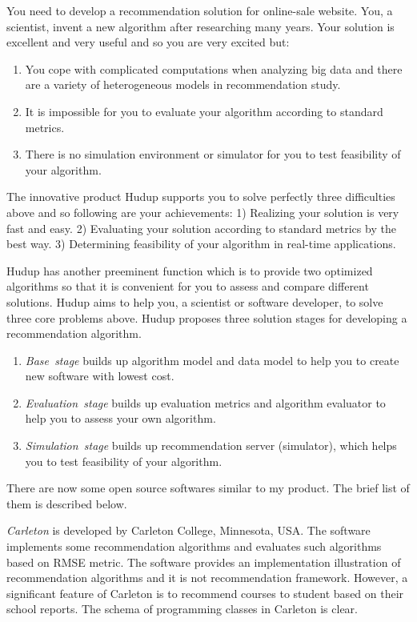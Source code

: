 \documentclass[a4paper]{llncs}
\begin{document}
You need to develop a recommendation solution for online-sale website. You, a scientist, invent a new algorithm after researching many years. Your solution is excellent and very useful and so you are very excited but:
\begin{enumerate}
\item You cope with complicated computations when analyzing big data and there are a variety of heterogeneous models in recommendation study.
\item It is impossible for you to evaluate your algorithm according to standard metrics.
\item There is no simulation environment or simulator for you to test feasibility of your algorithm.
\end{enumerate}
The innovative product Hudup supports you to solve perfectly three difficulties above and so following are your achievements: 1) Realizing your solution is very fast and easy. 2) Evaluating your solution according to standard metrics by the best way. 3) Determining feasibility of your algorithm in real-time applications.

Hudup has another preeminent function which is to provide two optimized algorithms so that it is convenient for you to assess and compare different solutions. Hudup aims to help you, a scientist or software developer, to solve three core problems above. Hudup proposes three solution stages for developing a recommendation algorithm.
\begin{enumerate}
\item \textit{Base~stage} builds up algorithm model and data model to help you to create new software with lowest cost.
\item \textit{Evaluation~stage} builds up evaluation metrics and algorithm evaluator to help you to assess your own algorithm.
\item \textit{Simulation~stage} builds up recommendation server (simulator), which helps you to test feasibility of your algorithm.
\end{enumerate}
There are now some open source softwares similar to my product. The brief list of them is described below.

\textit{Carleton} \cite{carleton} is developed by Carleton College, Minnesota, USA. The software implements some recommendation algorithms and evaluates such algorithms based on RMSE metric. The software provides an implementation illustration of recommendation algorithms and it is not recommendation framework. However, a significant feature of Carleton is to recommend courses to student based on their school reports. The schema of programming classes in Carleton is clear.
\end{document}
